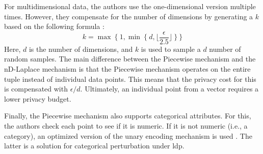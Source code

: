 For multidimensional data, the authors use the one-dimensional version multiple times.
However, they compensate for the number of dimensions by generating a $k$ based on the following formula \citep{wang_collecting_2019}:
\begin{equation}
  k = \max \ \{ \ 1, \min \ \{ \ d, \lfloor \frac{\epsilon}{2.5} \rfloor \ \} \ \}
\end{equation}
Here, $d$ is the number of dimensions, and $k$ is used to sample a $d$ number of random samples.
The main difference between the Piecewise mechanism and the nD-Laplace mechanism is that the Piecewise mechanism operates on the entire tuple instead of individual data points. This means that the privacy cost for this is compensated with $\epsilon / d$. Ultimately, an individual point from a vector requires a lower privacy budget.

Finally, the Piecewise mechanism also supports categorical attributes. For this, the authors check each point to see if it is numeric. If it is not numeric (i.e., a category), an optimized version of the unary encoding mechanism is used \citep{wang_collecting_2019}. The latter is a solution for categorical perturbation under \gls{ldp}.